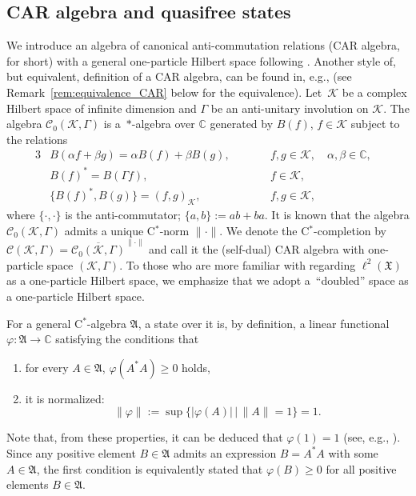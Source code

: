 \documentclass[pdftex]{sigma}
\numberwithin{equation}{section}
\newcommand{\mfrak}[1]{\mathfrak{#1}}
\newcommand{\mcal}[1]{\mathcal{#1}}
\newcommand{\mbb}[1]{\mathbb{#1}}
\begin{document}
\subsection{CAR algebra and quasifree states}
We introduce an algebra of canonical anti-commutation relations (CAR algebra, for short) with a general one-particle Hilbert space following \cite{Araki1970,Binnenhei1995}.
Another style of, but equivalent, definition of a CAR algebra, can be found in, e.g., \cite{BratteliRobinson1997} (see Remark~\ref{rem:equivalence_CAR} below for the equivalence).
Let~$\mcal{K}$ be a complex Hilbert space of infinite dimension and $\Gamma$ be an anti-unitary involution on $\mcal{K}$.
The algebra $\mcal{C}_{0}(\mcal{K},\Gamma)$ is a~$\ast$-algebra over $\mbb{C}$ generated by $B(f)$, $f\in\mcal{K}$ subject to the relations
\begin{alignat*}{3}
	&B(\alpha f+\beta g)=\alpha B(f)+\beta B(g),\qquad && f, g\in\mcal{K},\quad \alpha,\beta\in\mbb{C},& \\
	&B(f)^{\ast}= B(\Gamma f),\qquad && f\in\mcal{K},&\\
	&\{B(f)^{\ast}, B(g)\}=(f,g)_{\mcal{K}}, \qquad && f,g\in\mcal{K},&
\end{alignat*}
where $\{\cdot,\cdot\}$ is the anti-commutator; $\{a,b\}:=ab+ba$.
It is known that the algebra $\mcal{C}_{0}(\mcal{K},\Gamma)$ admits a unique C$^{\ast}$-norm $\|\cdot\|$. We denote the C$^{\ast}$-completion by $\mcal{C}(\mcal{K},\Gamma)=\overline{\mcal{C}_{0}(\mcal{K},\Gamma)}^{\|\cdot\|}$ and call it the (self-dual) CAR algebra with one-particle space $(\mcal{K},\Gamma)$. To those who are more familiar with regarding $\ell^{2}(\mfrak{X})$ as a one-particle Hilbert space, we emphasize that we adopt a~``doubled'' space as a one-particle Hilbert space.

For a general C$^{\ast}$-algebra $\mfrak{A}$, a state over it is, by definition, a linear functional $\varphi\colon \mfrak{A}\to\mbb{C}$ satisfying the conditions that
\begin{enumerate}\itemsep=0pt
\item[1)] 	for every $A\in\mfrak{A}$, $\varphi (A^{\ast}A)\ge 0$ holds,
\item[2)] 	it is normalized:
		\begin{equation*}
			\|\varphi\|:=\sup\big\{|\varphi (A)|\, \big|\, \|A\|=1\big\}=1.
		\end{equation*}
\end{enumerate}
Note that, from these properties, it can be deduced that $\varphi (1)=1$ (see, e.g., \cite[Chapter~I, Section~9]{Takesaki1979}). Since any positive element $B\in\mfrak{A}$ admits an expression $B=A^{\ast}A$ with some $A\in\mfrak{A}$, the first condition is equivalently stated that $\varphi (B)\ge 0$ for all positive elements $B\in \mfrak{A}$.
\end{document}
